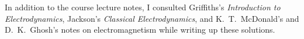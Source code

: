 \documentclass[11pt]{article}
\begin{document}
\newcommand{\vl}{\vb{l}}
\newcommand{\vL}{\vb{L}}
\newcommand{\ly}{l_y}
\newcommand{\cPi}{\cP_i}
\newcommand{\Tij}{T_{ij}}
\newcommand{\del}{\delta}
\newcommand{\delij}{\del_{ij}}
\newcommand{\vf}{\vb{f}}
\newcommand{\vT}{\vb{T}}

\newcommand{\Ex}{E_x}
\newcommand{\Ey}{E_y}
\newcommand{\Ez}{E_z}
\newcommand{\Bx}{B_x}
\newcommand{\By}{B_y}
\newcommand{\Bz}{B_z}
\newcommand{\intii}{\int_{-\infty}^\infty}

\clearpage



\vfill
{\small In addition to the course lecture notes, I consulted Griffiths's \emph{Introduction to Electrodynamics}, Jackson's \emph{Classical Electrodynamics}, and K.~T.~McDonald's and D.~K.~Ghosh's notes on electromagnetism while writing up these solutions.}
\end{document}

